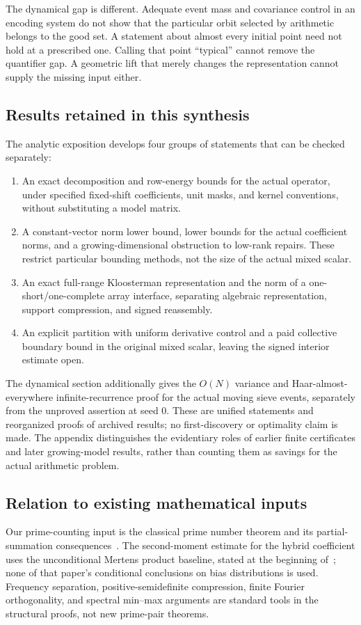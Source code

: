 The dynamical gap is different. Adequate event mass and covariance control in an encoding system do not show that the particular orbit selected by arithmetic belongs to the good set. A statement about almost every initial point need not hold at a prescribed one. Calling that point ``typical'' cannot remove the quantifier gap. A geometric lift that merely changes the representation cannot supply the missing input either.

\subsection{Results retained in this synthesis}
The analytic exposition develops four groups of statements that can be checked separately:
\begin{enumerate}
\item An exact decomposition and row-energy bounds for the actual operator, under specified fixed-shift coefficients, unit masks, and kernel conventions, without substituting a model matrix.
\item A constant-vector norm lower bound, lower bounds for the actual coefficient norms, and a growing-dimensional obstruction to low-rank repairs. These restrict particular bounding methods, not the size of the actual mixed scalar.
\item An exact full-range Kloosterman representation and the norm of a one-short/one-complete array interface, separating algebraic representation, support compression, and signed reassembly.
\item An explicit partition with uniform derivative control and a paid collective boundary bound in the original mixed scalar, leaving the signed interior estimate open.
\end{enumerate}
The dynamical section additionally gives the $O(N)$ variance and Haar-almost-everywhere infinite-recurrence proof for the actual moving sieve events, separately from the unproved assertion at seed $0$. These are unified statements and reorganized proofs of archived results; no first-discovery or optimality claim is made. The appendix distinguishes the evidentiary roles of earlier finite certificates and later growing-model results, rather than counting them as savings for the actual arithmetic problem.

\subsection{Relation to existing mathematical inputs}
Our prime-counting input is the classical prime number theorem and its partial-summation consequences~\cite{selberg1949}. The second-moment estimate for the hybrid coefficient uses the unconditional Mertens product baseline, stated at the beginning of~\cite{lamzouri2015}; none of that paper's conditional conclusions on bias distributions is used. Frequency separation, positive-semidefinite compression, finite Fourier orthogonality, and spectral min--max arguments are standard tools in the structural proofs, not new prime-pair theorems.

